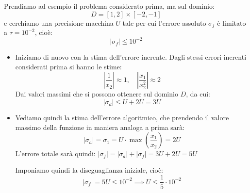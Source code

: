 \documentclass[a4paper,11pt]{article}
\begin{document}
Prendiamo ad esempio il problema considerato prima, ma sul dominio:
$$
D = [1, 2] \times [-2, -1]
$$
e cerchiamo una precisione macchina $U$ tale per cui l'errore assoluto $\sigma_f$ è limitato a $\tau = 10^{-2}$, cioè:
$$
|\sigma_f| \leq 10^{-2}
$$

\begin{itemize}
	\item Iniziamo di nuovo con la stima dell'errore inerente. Dagli stessi errori inerenti considerati prima si hanno le stime:
	$$
	\left| \frac{1}{x_2} \right| \approx 1, \quad
	\left| \frac{x_1}{x_2^2} \right| \approx 2
	$$
	Dai valori massimi che si possono ottenere sul dominio $D$, da cui:
	$$
	|\sigma_d| \leq U + 2U = 3U 
	$$
\item Vediamo quindi la stima dell'errore algoritmico, che prendendo il valore massimo della funzione in maniera analoga a prima sarà:
$$
|\sigma_a| = \sigma_1 = U \cdot \max\left( \frac{x_1}{x_2} \right) = 2U 
$$
L'errore totale sarà quindi:
$|\sigma_f| = |\sigma_a| + |\sigma_f| = 3U + 2U = 5U$ 

Imponiamo quindi la diseguaglianza iniziale, cioè:
$$
|\sigma_f| = 5U \leq 10^{-2} \implies U \leq \frac{1}{5} \cdot 10^{-2}
$$
\end{itemize}
\end{document}
